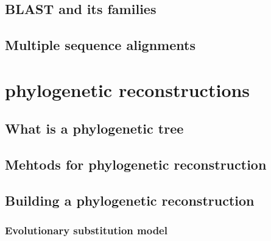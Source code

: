 \documentclass[
  letterpaper,
]{scrbook}
\begin{document}
\hypertarget{blast-and-its-families}{%
\section*{BLAST and its families}\label{blast-and-its-families}}

\hypertarget{multiple-sequence-alignments}{%
\section*{Multiple sequence
alignments}\label{multiple-sequence-alignments}}

\hypertarget{phylogenetic-reconstructions}{%
\chapter{phylogenetic
reconstructions}\label{phylogenetic-reconstructions}}

\hypertarget{what-is-a-phylogenetic-tree}{%
\section*{What is a phylogenetic
tree}\label{what-is-a-phylogenetic-tree}}

\hypertarget{mehtods-for-phylogenetic-reconstruction}{%
\section*{Mehtods for phylogenetic
reconstruction}\label{mehtods-for-phylogenetic-reconstruction}}

\hypertarget{building-a-phylogenetic-reconstruction}{%
\section*{Building a phylogenetic
reconstruction}\label{building-a-phylogenetic-reconstruction}}

\hypertarget{evolutionary-substitution-model}{%
\subsection*{Evolutionary substitution
model}\label{evolutionary-substitution-model}}
\end{document}
